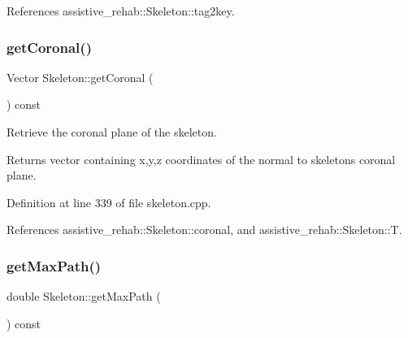 References assistive\+\_\+rehab\+::\+Skeleton\+::tag2key.

\mbox{\label{classassistive__rehab_1_1Skeleton_aa241a0ac93a9ead198f985073c8935eb}} 
\subsubsection{\texorpdfstring{getCoronal()}{getCoronal()}}
{\footnotesize\ttfamily Vector Skeleton\+::get\+Coronal (\begin{DoxyParamCaption}{ }\end{DoxyParamCaption}) const\hspace{0.3cm}{\ttfamily [inherited]}}



Retrieve the coronal plane of the skeleton. 

\begin{DoxyReturn}{Returns}
vector containing x,y,z coordinates of the normal to skeleton\textquotesingle{}s coronal plane. 
\end{DoxyReturn}


Definition at line 339 of file skeleton.\+cpp.


\begin{DoxyCode}{0}

\end{DoxyCode}


References assistive\+\_\+rehab\+::\+Skeleton\+::coronal, and assistive\+\_\+rehab\+::\+Skeleton\+::T.

\mbox{\label{classassistive__rehab_1_1Skeleton_acda9030cd2ed3ad92697418a5e2cff7c}} 
\subsubsection{\texorpdfstring{getMaxPath()}{getMaxPath()}}
{\footnotesize\ttfamily double Skeleton\+::get\+Max\+Path (\begin{DoxyParamCaption}{ }\end{DoxyParamCaption}) const\hspace{0.3cm}{\ttfamily [inherited]}}



